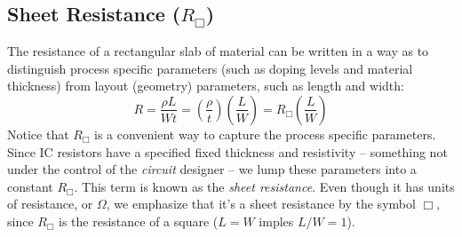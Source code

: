 \subsection{Sheet Resistance (\texorpdfstring{$R_{\Box}$}{})} \label{sec:sheetR}
The resistance of a rectangular slab of material can be written in a way as to distinguish process specific parameters (such as doping levels and material thickness) from layout (geometry) parameters, such as length and width: 
    \begin{equation} 
        R = \frac{{\rho L}}{{Wt}} = \left( {\frac{\rho }{t}} \right)\left( {\frac{L}{W}} \right) = {R_{\Box}}\left( {\frac{L}{W}} \right)
    \end{equation}
Notice that $R_{\Box}$ is a convenient way to capture the process specific parameters.  Since  IC resistors have a specified fixed thickness and resistivity – something not under the control of the \textit{circuit} designer – we lump these parameters into a constant $R_{\Box}$.  This term is known as the \textit{sheet resistance}.  Even though it has units of resistance, or $\Omega$, we emphasize that it's a sheet resistance by the symbol $\Box$, since $R_{\Box}$ is the resistance of a square ($L = W$ imples $L/W = 1$).  
